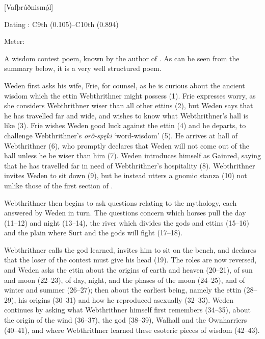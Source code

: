 [Vafþrúðnismǫ́l]

\begin{flushright}%
Dating \parencite{Sapp2022}: C9th (0.105)–C10th (0.894)

Meter: \Ljodahattr%
\end{flushright}%

A wisdom contest poem, known by the author of \Gylfaginning. As can be seen from the summary below, it is a very well structured poem.

Weden first asks his wife, Frie, for counsel, as he is curious about the ancient wisdom which the ettin Webthrithner might possess (1). Frie expresses worry, as she considers Webthrithner wiser than all other ettins (2), but Weden says that he has travelled far and wide, and wishes to know what Webthrithner’s hall is like (3). Frie wishes Weden good luck against the ettin (4) and he departs, to challenge Webthrithner’s \emph{orð-spęki} ‘word-wisdom’ (5). He arrives at hall of Webthrithner (6), who promptly declares that Weden will not come out of the hall unless he be wiser than him (7). Weden introduces himself as Gainred, saying that he has travelled far in need of Webthrithner’s hospitality (8). Webthrithner invites Weden to sit down (9), but he instead utters a gnomic stanza (10) not unlike those of the first section of \Havamal.

Webthrithner then begins to ask questions relating to the mythology, each answered by Weden in turn. The questions concern which horses pull the day (11–12) and night (13–14), the river which divides the gods and ettins (15–16) and the plain where Surt and the gods will fight (17–18).

Webthrithner calls the god learned, invites him to sit on the bench, and declares that the loser of the contest must give his head (19). The roles are now reversed, and Weden asks the ettin about the origins of earth and heaven (20–21), of sun and moon (22–23), of day, night, and the phases of the moon (24–25), and of winter and summer (26–27); then about the earliest being, namely the ettin  (28–29), his origins (30–31) and how he reproduced asexually (32–33). Weden continues by asking what Webthrithner himself first remembers (34–35), about the origin of the wind (36–37), the god  (38–39), Walhall and the Ownharriers (40–41), and where Webthrithner learned these esoteric pieces of wisdom (42–43).


